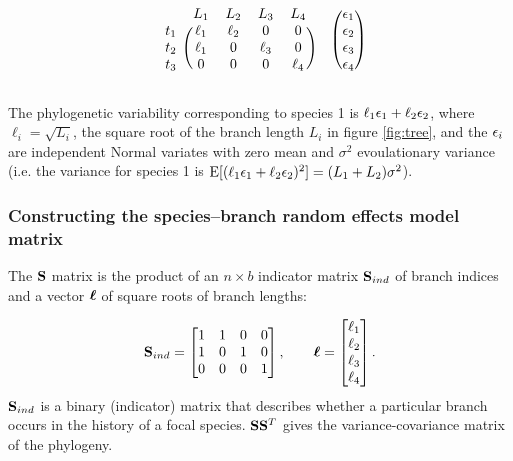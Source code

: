 \documentclass[12pt]{article}
\begin{document}
\[
\begin{blockarray}{ccccc}
 & L_1 & L_2 & L_3 & L_4  \\
\begin{block}{c(cccc)}
  t_1 & \ell_1 & \ell_2 & 0           & 0 \\
  t_2 & \ell_1 &  0          & \ell_3 & 0 \\
  t_3 & 0           &  0          & 0           & \ell_4 \\
\end{block}
\end{blockarray}
\hspace{0.5cm}
\begin{blockarray}{(c)}
  \e_1 \\
  \e_2 \\
  \e_3 \\
  \e_4 \\
\end{blockarray}
 \]


The phylogenetic variability corresponding to species 1 is $\ell_1 { \epsilon}_1 + \ell_2 { \epsilon}_2$, where $\ell_i = \sqrt{L_i}$, the square root of the branch length $L_i$ in figure \ref{fig:tree}, and the ${ \epsilon}_i$ are independent Normal variates with zero mean and $\sigma^2$ evoulationary variance (i.e. the variance for species 1 is $\textrm{E}[(\ell_1 { \epsilon}_1 + \ell_2 { \epsilon}_2)^2] = (L_1 + L_2)\sigma^2$).

\subsubsection*{Constructing the species--branch random effects model matrix}

The ${\mathbf S}$ matrix is the product of an $n \times b$ indicator matrix ${\mathbf S}_{ind}$ of branch indices and a vector ${\boldsymbol \ell}$ of square roots of branch lengths:

\begin{align}
{\mathbf S}_{ind} = \begin{bmatrix}
1 & 1 & 0 & 0 \\ 
1 & 0 & 1 & 0 \\ 
0 & 0 & 0 & 1
\end{bmatrix} , 
\qquad
{\boldsymbol \ell} = \begin{bmatrix}
\ell_1 \\
\ell_2 \\
\ell_3 \\
\ell_4 
\end{bmatrix} .
\label{eq:S}
\end{align}
${\mathbf S}_{ind}$ is a binary (indicator) matrix that describes whether a particular branch occurs in the history of a focal species. 
${\mathbf S} {\mathbf S}^T$ gives the variance-covariance matrix of the phylogeny. 
\end{document}

